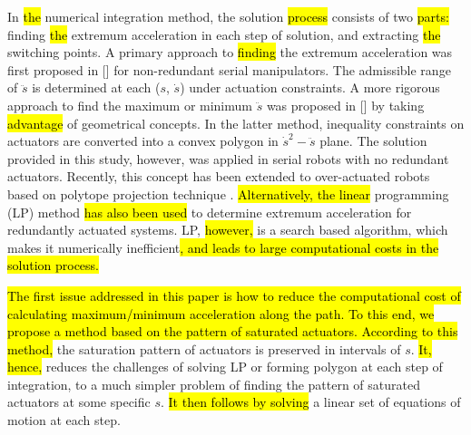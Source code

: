 \documentclass{rob}%
\begin{document}
In \hl{the} numerical integration method, the solution \hl{process} consists of two \hl{parts:} finding \hl{the} extremum acceleration in each step of solution, and extracting \hl{the} switching points.
A primary approach to \hl{finding} the extremum acceleration was first proposed in [] for non-redundant serial manipulators. The admissible range of $ \ddot s $ is determined at each ($ s $, $ \dot s $) under actuation constraints.
A more rigorous approach to find the maximum or minimum $ \ddot s $ was proposed in [] by taking \hl{advantage} of geometrical concepts.
In the latter method, inequality constraints on actuators are converted into a convex polygon in $ {\dot s}^2-\ddot s $ plane.
The solution provided in this study, however, was applied in serial robots with no redundant actuators.
Recently, this concept has been extended to over-actuated robots based on polytope projection technique \cite{Pham2015}.
\hl{Alternatively, the linear} programming (LP) method \cite{Moon1990, Bobrow1990, Moon1991, Moon1997} \hl{has also been used} to determine extremum acceleration for redundantly actuated systems. LP, \hl{however,} is a search based algorithm, which makes it numerically inefficient\hl{, and leads to large computational costs in the solution process.}
	
\hl{The first issue addressed in this paper is how to reduce the computational cost of calculating maximum/minimum acceleration along the path. To this end, we propose a method based on the pattern of saturated actuators. 
According to this method, }the saturation pattern of actuators is preserved in intervals of $ s $. \hl{It, hence,} reduces the challenges of solving LP \cite{Moon1990, Bobrow1990, Moon1991, Moon1997} or forming polygon \cite{Pham2015} at each step of integration, to a much simpler problem of finding the pattern of saturated actuators at some specific $ s $. \hl{It then follows by solving} a linear set of equations of motion at each step.
	
\end{document}
